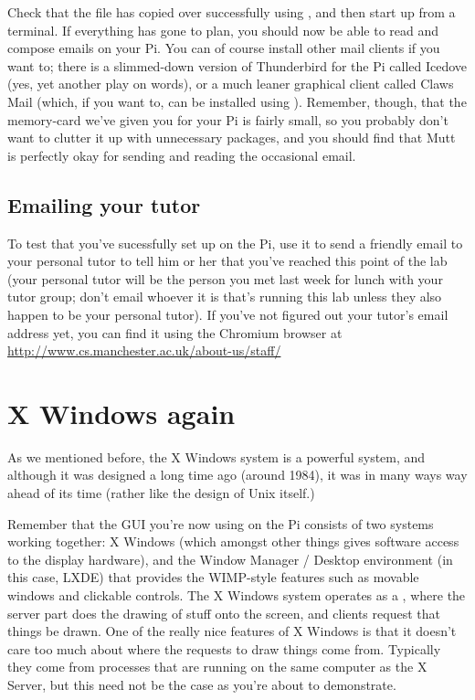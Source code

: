 Check that the file has copied over successfully using
, and then start up  from a
terminal. If everything has gone to plan, you should now be able to
read and compose emails on your Pi. You can of course install other
mail clients if you want to; there is a slimmed-down version of
Thunderbird for the Pi called Icedove (yes, yet another play on
words), or a much leaner graphical client called Claws Mail (which, if
you want to, can be installed using ). Remember, though, that the memory-card we've given you
for your Pi is fairly small, so you probably don't want to clutter it
up with unnecessary packages, and you should find that Mutt is
perfectly okay for sending and reading the occasional email.

\subsection{Emailing your tutor}

To test that you've sucessfully set  up on the Pi,
use it to send a friendly email to your personal tutor to tell him or
her that you've reached this point of the lab (your personal tutor
will be the person you met last week for lunch with your tutor group;
don't email whoever it is that's running this lab unless they also
happen to be your personal tutor). If you've not figured out your
tutor's email address yet, you can find it using the Chromium browser
at \\ \url{http://www.cs.manchester.ac.uk/about-us/staff/}

\section{X Windows again}

As we mentioned before, the X Windows system is a powerful system, and
although it was designed a long time ago (around 1984), it was in many
ways way ahead of its time (rather like the design of Unix itself.)

Remember that the GUI you're now using on the Pi consists of two
systems working together: X Windows (which amongst other things gives
software access to the display hardware), and the Window Manager /
Desktop environment (in this case, LXDE) that provides the WIMP-style
features such as movable windows and clickable controls. The X Windows
system operates as a , where the
server part does the drawing of stuff onto the screen, and clients
request that things be drawn. One of the really nice features of X
Windows is that it doesn't care too much about where the requests to
draw things come from. Typically they come from processes that are
running on the same computer as the X Server, but this need not be the
case as you're about to demonstrate.


